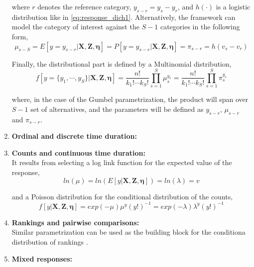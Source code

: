 \begin{enumerate}
	where $r$ denotes the reference category, $y_{s-r}=y_{s} - y_{r}$, and $h(\cdot)$ is a logistic distribution like in \ref{eq:response_dich1}. Alternatively, the framework can model the category of interest against the $S-1$ categories in the following form,
	\begin{equation} \label{eq:link_poly2}
		\mu_{s-S} = E[y=y_{s-r} | \mathbf{X}, \mathbf{Z}, \pmb{\eta}] = P[y=y_{s-r} | \mathbf{X}, \mathbf{Z}, \pmb{\eta}] = \pi_{s-r} = h(v_{s} - v_{r})
	\end{equation}
	
	Finally, the distributional part is defined by a Multinomial distribution,
	\begin{equation} \label{eq:dist_poly}
		f[y=\{y_{1}, \cdots, y_{S}\} | \mathbf{X}, \mathbf{Z}, \pmb{\eta}] = \frac{n!}{k_{1}! \cdots k_{S}!} \prod_{s=1}^{S} \mu_{s}^{y_{s}} = \frac{n!}{k_{1}! \cdots k_{S}!} \prod_{s=1}^{S} \pi_{s}^{y_{s}}
	\end{equation}
	
	where, in the case of the Gumbel parametrization, the product will span over $S-1$ set of alternatives, and the parameters will be defined as $y_{s-r}$, $\mu_{s-r}$ and $\pi_{s-r}$. 

	
	
	\item \textbf{Ordinal and discrete time duration:} \\
	
	
	\item \textbf{Counts and continuous time duration:} \\
	It results from selecting a log link function for the expected value of the response,
	\begin{equation} \label{eq:link_count}
		ln(\mu) = ln(E[y | \mathbf{X}, \mathbf{Z}, \pmb{\eta}]) = ln(\lambda) = v
	\end{equation}
	
	and a Poisson distribution for the conditional distribution of the counts,
	\begin{equation} \label{eq:dist_count}
		f[y| \mathbf{X}, \mathbf{Z}, \pmb{\eta}] = exp(-\mu) \mu^{y} (y!)^{-1} = exp(-\lambda) \lambda^{y} (y!)^{-1}
	\end{equation}
	
	
	\item \textbf{Rankings and pairwise comparisons:} \\
	Similar parametrization can be used as the building block for the conditiona distribution of rankings \citep{Rabe_et_al_2003}. 


		
	\item \textbf{Mixed responses:} \\

\end{enumerate}

